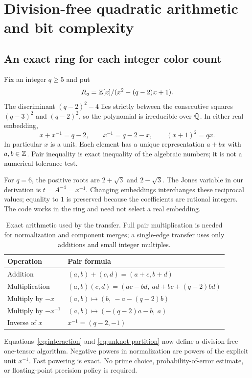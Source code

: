 \section{Division-free quadratic arithmetic and bit complexity}
\label{sec:exact}

\subsection{An exact ring for each integer color count}

Fix an integer $q\ge5$ and put
\[
 R_q=\mathbb Z[x]/(x^2-(q-2)x+1).
\]
The discriminant $(q-2)^2-4$ lies strictly between the consecutive squares
$(q-3)^2$ and $(q-2)^2$, so the polynomial is irreducible over $\mathbb Q$.
In either real embedding,
\[
 x+x^{-1}=q-2,\qquad x^{-1}=q-2-x,\qquad (x+1)^2=qx.
\]
In particular $x$ is a unit. Each element has a unique representation
$a+bx$ with $a,b\in\mathbb Z$. Pair inequality is exact inequality of the algebraic
numbers; it is not a numerical tolerance test.

For $q=6$, the positive roots are $2+\sqrt3$ and $2-\sqrt3$.
The Jones variable in our derivation is $t=A^{-4}=x^{-1}$.
Changing embeddings interchanges these reciprocal values; equality to $1$
is preserved because the coefficients are rational integers.
The code works in the ring and need not select a real embedding.

\begin{table}[htbp]
\centering\small
\begin{tabular}{@{}ll@{}}
\toprule
Operation & Pair formula\\
\midrule
Addition & $(a,b)+(c,d)=(a+c,b+d)$\\
Multiplication & $(a,b)(c,d)=(ac-bd,\ ad+bc+(q-2)bd)$\\
Multiply by $-x$ & $(a,b)\mapsto(b,\ -a-(q-2)b)$\\
Multiply by $-x^{-1}$ & $(a,b)\mapsto(-(q-2)a-b,\ a)$\\
Inverse of $x$ & $x^{-1}=(q-2,-1)$\\
\bottomrule
\end{tabular}
\caption{Exact arithmetic used by the transfer. Full pair multiplication
is needed for normalization and component merges; a single-edge transfer
uses only additions and small integer multiples.}
\label{tab:pairs}
\end{table}

Equations~\eqref{eq:interaction} and \eqref{eq:unknot-partition} now define a
division-free one-tensor algorithm. Negative powers in normalization are
powers of the explicit unit $x^{-1}$. Fast powering is exact. No prime choice,
probability-of-error estimate, or floating-point precision policy is required.

